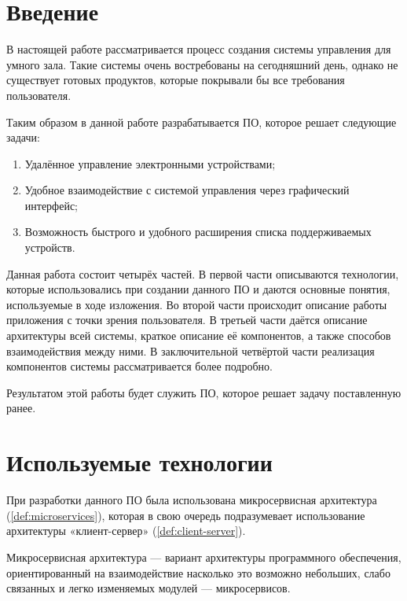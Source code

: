 \section*{Введение}

В настоящей работе рассматривается процесс создания системы управления для умного зала. Такие системы очень востребованы
на сегодняшний день, однако не существует готовых продуктов, которые покрывали бы все требования пользователя.

Таким образом в данной работе разрабатывается ПО, которое решает следующие задачи:
\begin{enumerate}
    \item Удалённое управление электронными устройствами;
    \item Удобное взаимодействие с системой управления через графический интерфейс;
    \item Возможность быстрого и удобного расширения списка поддерживаемых устройств.
\end{enumerate}

Данная работа состоит четырёх частей. В первой части описываются технологии, которые использовались при создании данного ПО
и даются основные понятия, используемые в ходе изложения. Во второй части происходит описание работы приложения с точки
зрения пользователя. В третьей части даётся описание архитектуры всей системы, краткое описание её компонентов, а также способов
взаимодействия между ними. В заключительной четвёртой части реализация компонентов системы рассматривается более подробно.

Результатом этой работы будет служить ПО, которое решает задачу поставленную ранее.

\clearpage

\section{Используемые технологии}

При разработки данного ПО была использована микросервисная архитектура (\ref{def:microservices}), которая в свою очередь
подразумевает использование архитектуры «клиент-сервер» (\ref{def:client-server}).

\begin{definition}
    \label{def:microservices}
    Микросервисная архитектура — вариант архитектуры программного обеспечения,
    ориентированный на взаимодействие насколько это возможно небольших, слабо связанных и легко изменяемых
    модулей — микросервисов.
\end{definition}

